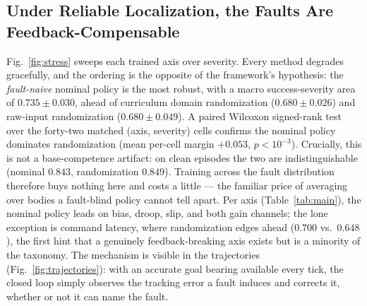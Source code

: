 \documentclass[journal]{IEEEtran}
\begin{document}
\subsection{Under Reliable Localization, the Faults Are Feedback-Compensable}
Fig.~\ref{fig:stress} sweeps each trained axis over severity. Every method
degrades gracefully, and the ordering is the opposite of the framework's
hypothesis: the \emph{fault-naive} nominal policy is the most robust, with a
macro success-severity area of $0.735 \pm 0.030$, ahead of curriculum domain
randomization ($0.680 \pm 0.026$) and raw-input randomization
($0.680 \pm 0.049$). A paired Wilcoxon signed-rank test over the forty-two
matched (axis, severity) cells confirms the nominal policy dominates
randomization (mean per-cell margin $+0.053$, $p < 10^{-3}$). Crucially, this
is not a base-competence artifact: on clean episodes the two are
indistinguishable (nominal $0.843$, randomization $0.849$). Training across the
fault distribution therefore buys nothing here and costs a little --- the
familiar price of averaging over bodies a fault-blind policy cannot tell
apart. Per axis (Table~\ref{tab:main}), the nominal policy leads on bias,
droop, slip, and both gain channels; the lone exception is command latency,
where randomization edges ahead ($0.700$ vs.\ $0.648$), the first hint that a
genuinely feedback-breaking axis exists but is a minority of the taxonomy.
The mechanism is visible in the trajectories (Fig.~\ref{fig:trajectories}):
with an accurate goal bearing available every tick, the closed loop simply
observes the tracking error a fault induces and corrects it, whether or not it
can name the fault.
\end{document}
